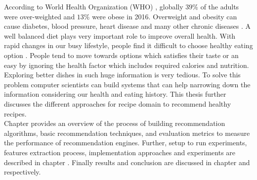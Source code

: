 According to World Health Organization (WHO) \cite{42}, globally $39\%$ of the adults were over-weighted and $13\%$ were obese in 2016. Overweight and obesity can cause diabetes, blood pressure, heart disease and many other chronic diseases \cite{43}. A well balanced diet plays very important role to improve overall health. With rapid changes in our busy lifestyle, people find it difficult to choose healthy eating option \cite{13}. People tend to move towards options which satisfies their taste or an easy by ignoring the health factor which includes required calories and nutrition. Exploring better dishes in such huge information is very tedious. To solve this problem computer scientists can build systems that can help narrowing down the information considering our health and eating history. This thesis further discusses the different approaches for recipe domain to recommend healthy recipes.
\\
Chapter  provides an overview of the process of building recommendation algorithms, basic recommendation techniques, and evaluation metrics to measure the performance of recommendation engines. Further, setup to run experiments, features extraction process, implementation approaches and experiments are described in chapter . Finally results and conclusion are discussed in chapter  and  respectively.
\pagebreak


